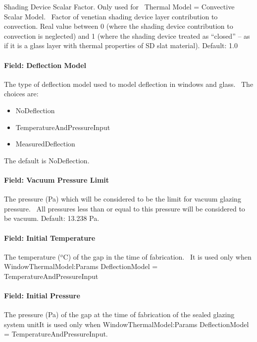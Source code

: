 Shading Device Scalar Factor. Only used for~ Thermal Model = Convective Scalar Model.~ Factor of venetian shading device layer contribution to convection. Real value between 0 (where the shading device contribution to convection is neglected) and 1 (where the shading device treated as ``closed'' -- as if it is a glass layer with thermal properties of SD slat material). Default: 1.0

\paragraph{Field: Deflection Model}\label{field-deflection-model}

The type of deflection model used to model deflection in windows and glass.~ The choices are:

\begin{itemize}
\item
  NoDeflection
\item
  TemperatureAndPressureInput
\item
  MeasuredDeflection
\end{itemize}

The default is NoDeflection.

\paragraph{Field: Vacuum Pressure Limit}\label{field-vacuum-pressure-limit}

The pressure (Pa) which will be considered to be the limit for vacuum glazing pressure.~ All pressures less than or equal to this pressure will be considered to be vacuum. Default: 13.238 Pa.

\paragraph{Field: Initial Temperature}\label{field-initial-temperature}

The temperature (\(^{o}\)C) of the gap in the time of fabrication.~ It is used only when WindowThermalModel:Params DeflectionModel = TemperatureAndPressureInput

\paragraph{Field: Initial Pressure}\label{field-initial-pressure}

The pressure (Pa) of the gap at the time of fabrication of the sealed glazing system unitIt is used only when WindowThermalModel:Params DeflectionModel = TemperatureAndPressureInput.

